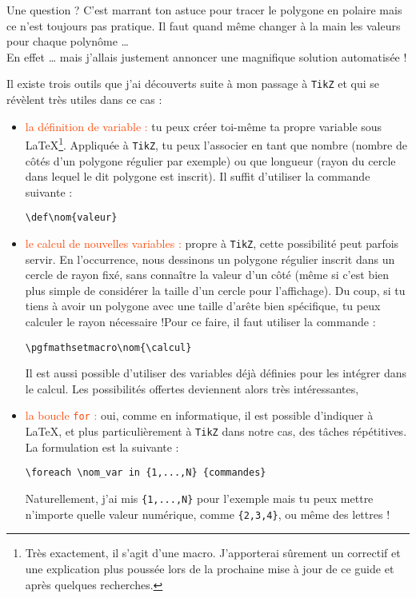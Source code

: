 \begin{attentionbox}{Une question ?}
\og C'est marrant ton astuce pour tracer le polygone en polaire mais ce n'est toujours pas pratique. Il faut quand même changer à la main les valeurs pour chaque polynôme \dots{} \fg{} \\

En effet \dots{} mais j'allais justement annoncer une magnifique solution automatisée !
\end{attentionbox}

Il existe trois outils que j'ai découverts suite à mon passage à \texttt{TikZ} et qui se révèlent très utiles dans ce cas :

\begin{itemize}[label = ]
\item \textcolor{OrangeRed}{la définition de variable :} tu peux créer toi-même ta propre variable sous \LaTeX{}\footnote{Très exactement, il s'agit d'une macro. J'apporterai sûrement un correctif et une explication plus poussée lors de la prochaine mise à jour de ce guide et après quelques recherches.}. Appliquée à \texttt{TikZ}, tu peux l'associer en tant que nombre (nombre de côtés d'un polygone régulier par exemple) ou que longueur (rayon du cercle dans lequel le dit polygone est inscrit). Il suffit d'utiliser la commande suivante : \begin{center} \verb?\def\nom{valeur}? \end{center}

\item \textcolor{OrangeRed}{le calcul de nouvelles variables :} propre à \texttt{TikZ}, cette possibilité peut parfois servir. En l'occurrence, nous dessinons un polygone régulier inscrit dans un cercle de rayon fixé, sans connaître la valeur d'un côté (même si c'est bien plus simple de considérer la taille d'un cercle pour l'affichage). Du coup, si tu tiens à avoir un polygone avec une taille d'arête bien spécifique, tu peux calculer le rayon nécessaire !Pour ce faire, il faut utiliser la commande : \begin{center} \verb?\pgfmathsetmacro\nom{\calcul}? \end{center}

Il est aussi possible d'utiliser des variables déjà définies pour les intégrer dans le calcul. Les possibilités offertes deviennent alors très intéressantes, \\

\item \textcolor{OrangeRed}{la boucle \verb?for? :} oui, comme en informatique, il est possible d'indiquer à \LaTeX{}, et plus particulièrement à \texttt{TikZ} dans notre cas, des tâches répétitives. La formulation est la suivante : \begin{center} \verb?\foreach \nom_var in {1,...,N} {commandes}? \end{center}

Naturellement, j'ai mis \verb?{1,...,N}? pour l'exemple mais tu peux mettre n'importe quelle valeur numérique, comme \verb?{2,3,4}?, ou même des lettres ! \\
\end{itemize}

